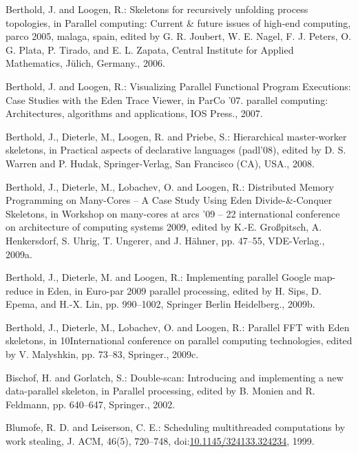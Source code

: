 \documentclass[paper=A4,twoside=true,openright,parskip=full,chapterprefix=true,headings=normal,bibliography=totoc,listof=totoc,titlepage=on,captions=tableabove,draft=false,british]{scrreprt}%
\begin{document}
\leavevmode\hypertarget{ref-Eden:PARCO05}{}%
Berthold, J. and Loogen, R.: Skeletons for recursively unfolding process
topologies, in Parallel computing: Current \& future issues of high-end
computing, parco 2005, malaga, spain, edited by G. R. Joubert, W. E.
Nagel, F. J. Peters, O. G. Plata, P. Tirado, and E. L. Zapata, Central
Institute for Applied Mathematics, Jülich, Germany., 2006.

\leavevmode\hypertarget{ref-Berthold2007a}{}%
Berthold, J. and Loogen, R.: Visualizing Parallel Functional Program
Executions: Case Studies with the Eden Trace Viewer, in ParCo '07.
parallel computing: Architectures, algorithms and applications, IOS
Press., 2007.

\leavevmode\hypertarget{ref-PADL08HMWS}{}%
Berthold, J., Dieterle, M., Loogen, R. and Priebe, S.: Hierarchical
master-worker skeletons, in Practical aspects of declarative languages
(padl'08), edited by D. S. Warren and P. Hudak, Springer-Verlag, San
Francisco (CA), USA., 2008.

\leavevmode\hypertarget{ref-arcs-dc}{}%
Berthold, J., Dieterle, M., Lobachev, O. and Loogen, R.: Distributed
Memory Programming on Many-Cores -- A Case Study Using Eden
Divide-\&-Conquer Skeletons, in Workshop on many-cores at arcs '09 -- 22
international conference on architecture of computing systems 2009,
edited by K.-E. Großpitsch, A. Henkersdorf, S. Uhrig, T. Ungerer, and J.
Hähner, pp. 47--55, VDE-Verlag., 2009a.

\leavevmode\hypertarget{ref-Berthold2009-mr}{}%
Berthold, J., Dieterle, M. and Loogen, R.: Implementing parallel Google
map-reduce in Eden, in Euro-par 2009 parallel processing, edited by H.
Sips, D. Epema, and H.-X. Lin, pp. 990--1002, Springer Berlin
Heidelberg., 2009b.

\leavevmode\hypertarget{ref-Berthold2009-fft}{}%
Berthold, J., Dieterle, M., Lobachev, O. and Loogen, R.: Parallel FFT
with Eden skeletons, in 10International conference on parallel computing
technologies, edited by V. Malyshkin, pp. 73--83, Springer., 2009c.

\leavevmode\hypertarget{ref-Bischof2002}{}%
Bischof, H. and Gorlatch, S.: Double-scan: Introducing and implementing
a new data-parallel skeleton, in Parallel processing, edited by B.
Monien and R. Feldmann, pp. 640--647, Springer., 2002.

\leavevmode\hypertarget{ref-Blumofe:1999:SMC:324133.324234}{}%
Blumofe, R. D. and Leiserson, C. E.: Scheduling multithreaded
computations by work stealing, J. ACM, 46(5), 720--748,
doi:\href{https://doi.org/10.1145/324133.324234}{10.1145/324133.324234},
1999.
\end{document}
